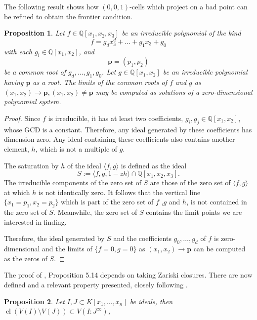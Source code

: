 \documentclass[
]{book}
\newtheorem{proposition}{Proposition}[chapter]
\theoremstyle{definition}
\theoremstyle{definition}
\theoremstyle{definition}
\theoremstyle{definition}
\theoremstyle{remark}
\begin{document}
The following result shows how \((0,0,1)\)-cells which project on a bad point can be refined to obtain the frontier condition.

\begin{proposition}
\protect\hypertarget{prp:lazard-5-14}{}\label{prp:lazard-5-14}\citep[Proposition 5.14]{lazard10}
Let \(f \in \mathbb{Q}[x_1,x_2,x_3]\) be an irreducible polynomial of the kind
\[f = g_dx_3^d + \ldots + g_1x_3 + g_0\]
with each \(g_i \in \mathbb{Q}[x_1,x_2]\), and
\[\mathbf{p} = (p_1,p_2)\]
be a common root of \(g_d,\ldots,g_1,g_0\).
Let \(g\in \mathbb{Q}[x_1,x_2]\) be an irreducible polynomial having \(\mathbf{p}\) as a root.
The limits of the common roots of \(f\) and \(g\) as \((x_1, x_2) \to \mathbf{p}, (x_1, x_2) \ne \mathbf{p}\) may be computed as solutions of a zero-dimensional
polynomial system.
\end{proposition}

\begin{proof}
Since \(f\) is irreducible, it has at least two coefficients, \(g_i,g_j \in \mathbb{Q}[x_1,x_2]\), whose GCD is a constant.
Therefore, any ideal generated by these coefficients has dimension zero. Any ideal containing these coefficients also contains another element, \(h\), which is not a multiple of \(g\).

The saturation by \(h\) of the ideal \(\langle f,g \rangle\) is defined as the ideal
\[
S := \langle f, g, 1 - zh \rangle \cap \mathbb{Q}[x_1,x_2,x_3].
\]
The irreducible components of the zero set of \(S\) are those of the zero set of \(\langle f,g \rangle\) at which \(h\) is not identically zero. It follows that the vertical line \(\{ x_1 = p_1, x_2 = p_2 \}\) which is part of the zero set of \(f\) ,\(g\) and \(h\), is not contained in the zero set of \(S\). Meanwhile, the zero set of \(S\) contains the limit points we are interested in finding.

Therefore, the ideal generated by \(S\) and the coefficients \(g_0,\ldots,g_d\) of \(f\) is zero-dimensional and the limits of \(\{ f=0,g=0 \}\) as \((x_1,x_2) \to \mathbf{p}\) can be computed as the zeros of \(S\).
\end{proof}

The proof of \citet{lazard10}, Proposition 5.14 depends on taking Zariski closures. There are now defined and a relevant property presented, closely following \citet{cox2013}.

\begin{proposition}
\protect\hypertarget{prp:cox-zariski}{}\label{prp:cox-zariski}\citep[ p203, part of Theorem 10]{cox2013}
Let \(I,J \subset K[x_1,\ldots,x_n]\) be ideals, then
\({\operatorname{cl} \left(  V(I) \setminus V(J)  \right)} \subset V(I : J^\infty)\),
\end{proposition}
\end{document}
